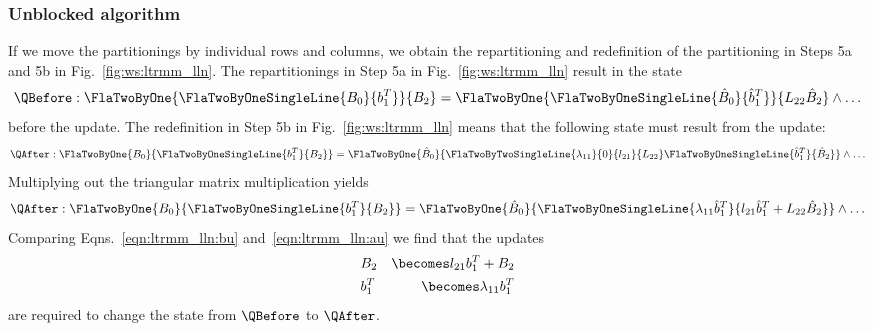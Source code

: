 \subsubsection{Unblocked algorithm}

If we move the partitionings by individual rows and columns, we obtain
the repartitioning and redefinition of the partitioning in Steps 5a
and 5b in Fig.~\ref{fig:ws:ltrmm_lln}.  The repartitionings in Step 5a
in Fig.~\ref{fig:ws:ltrmm_lln} result in the state
\begin{equation}
\label{eqn:ltrmm_lln:bu}
\QBefore: 
\FlaTwoByOne{ 
\FlaTwoByOneSingleLine{ B_0 }{ b_1^T }
}
{
B_2
} =
\FlaTwoByOne{ 
\FlaTwoByOneSingleLine{ \hat{B}_0 }{ \hat{b}_1^T }
}
{
L_{22} \hat{B}_2
}
\wedge \ldots
\end{equation}
before the update.  The redefinition in Step 5b in
Fig.~\ref{fig:ws:ltrmm_lln} means that the following state must result
from the update:
\[
\QAfter: 
\FlaTwoByOne{ 
B_0
}
{
\FlaTwoByOneSingleLine{ b_1^T }{ B_2 }
} =
\FlaTwoByOne{ 
\hat{B}_0
}
{
\FlaTwoByTwoSingleLine{ \lambda_{11} }{ 0 }
                      { l_{21} }{ L_{22} }
\FlaTwoByOneSingleLine{ \hat{b}_1^T }{ \hat{B}_2 }
}
\wedge \ldots
\]
Multiplying out the triangular matrix multiplication yields
\begin{equation}
\label{eqn:ltrmm_lln:au}
\QAfter: 
\FlaTwoByOne{ 
B_0
}
{
\FlaTwoByOneSingleLine{ b_1^T }{ B_2 }
} =
\FlaTwoByOne{ 
\hat{B}_0
}
{
\FlaTwoByOneSingleLine{ \lambda_{11} \hat{b}_1^T }{ l_{21} \hat{b}_1^T + L_{22} \hat{B}_2 }
}
\wedge \ldots
\end{equation}
Comparing Eqns.~\ref{eqn:ltrmm_lln:bu} and~\ref{eqn:ltrmm_lln:au} we
find that the updates
\begin{eqnarray*}
& B_2 & \becomes l_{21} b_1^T + B_2 \\
& b_1^T & \becomes \lambda_{11} b_1^T 
\end{eqnarray*}
are required to change the state from $ \QBefore $ to $ \QAfter $.


\renewcommand{\operation}{B \becomes L B}

\renewcommand{\precondition}{B = \hat{B} \wedge \LowTr( L ) \wedge \ColDim( L )=\RowDim( B )}

\renewcommand{\postcondition}{B = L \hat{B}}

\renewcommand{\invariant}{
\FlaTwoByOne{ B_T}{B_B} =
\FlaTwoByOne{ \hat{B}_T }
            { L_{BR} \hat{B}_B }
\wedge
\ldots
}


